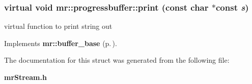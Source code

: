\subsubsection{\setlength{\rightskip}{0pt plus 5cm}virtual void mr::progressbuffer::print (const char $\ast$const {\em s})\hspace{0.3cm}{\tt  [inline, virtual]}}\label{structmr_1_1progressbuffer_a1}


virtual function to print string out 



Implements {\bf mr::buffer\_\-base} {\rm (p.\,\pageref{structmr_1_1buffer__base_a3})}.

The documentation for this struct was generated from the following file:\begin{CompactItemize}
\item 
{\bf mr\-Stream.h}\end{CompactItemize}

